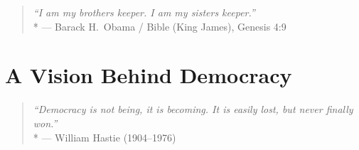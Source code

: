 






\begin{quote}
	\emph{``I am my brothers keeper. I am my sisters keeper.''}
	\\*
	--- Barack H.\ Obama / Bible (King James), Genesis 4:9
\end{quote}

\section{A Vision Behind Democracy}

\begin{quote}
	\emph{``Democracy is not being, it is becoming.
	It is easily lost, but never finally won.''}
	\\*
	--- William Hastie (1904--1976)
\end{quote}

